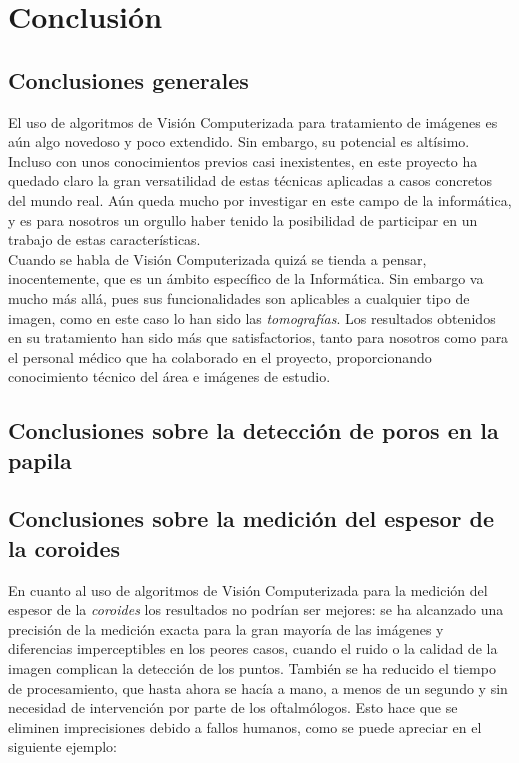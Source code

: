 \chapter{Conclusión}
\section{Conclusiones generales}
El uso de algoritmos de Visión Computerizada para tratamiento de
imágenes es aún algo novedoso y poco extendido. Sin embargo, su
potencial es altísimo. Incluso con unos conocimientos previos
casi inexistentes, en este proyecto ha quedado claro la gran
versatilidad de estas técnicas aplicadas a casos concretos del
mundo real. Aún queda mucho por investigar en este campo de la
informática, y es para nosotros un orgullo haber tenido la 
posibilidad de participar en un trabajo de estas características.\\
Cuando se habla de Visión Computerizada quizá se tienda a pensar,
inocentemente, que es un ámbito específico de la Informática. Sin
embargo va mucho más allá, pues sus funcionalidades son aplicables
a cualquier tipo de imagen, como en este caso lo han sido las 
\emph{tomografías}. Los resultados obtenidos en su tratamiento han
sido más que satisfactorios, tanto para nosotros como para el 
personal médico que ha colaborado en el proyecto, proporcionando
conocimiento técnico del área e imágenes de estudio.

\section{Conclusiones sobre la detección de poros en la papila}

\section{Conclusiones sobre la medición del espesor de la coroides}
En cuanto al uso de algoritmos de Visión Computerizada para la 
medición del espesor de la \emph{coroides} los resultados no
podrían ser mejores: se ha alcanzado una precisión de la medición
exacta para la gran mayoría de las imágenes y diferencias 
imperceptibles en los peores casos, cuando el ruido o la calidad
de la imagen complican la detección de los puntos. También se
ha reducido el tiempo de procesamiento, que hasta ahora se hacía
a mano, a menos de un segundo y sin necesidad de intervención
por parte de los oftalmólogos. Esto hace que se eliminen imprecisiones
debido a fallos humanos, como se puede apreciar en el siguiente ejemplo:


